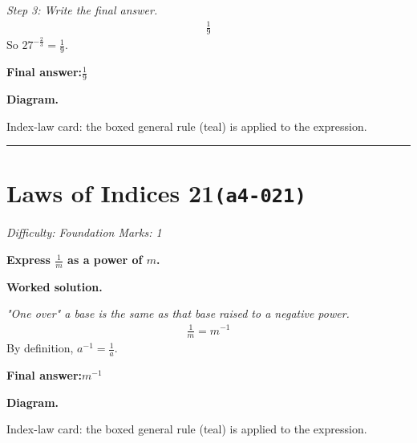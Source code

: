 \documentclass[11pt]{article}
\newcommand{\question}[1]{\par\medskip\noindent\textbf{#1}\par}
\begin{document}
\textit{Step 3: Write the final answer.}
\[\begin{gathered}
\frac{1}{9}
\end{gathered}\]
So \( 27^{-\frac{2}{3}} = \frac{1}{9} \).

\begin{answerbox}
\textbf{Final answer:}\quad \(\displaystyle \frac{1}{9}\)
\end{answerbox}
\textbf{Diagram.}

\begin{center}
\end{center}
\small Index-law card: the boxed general rule (teal) is applied to the expression.\normalsize

\medskip\hrule

\section*{Laws of Indices 21\quad\small\texttt{(a4-021)}}
\textit{Difficulty: Foundation \quad\textbar\quad Marks: 1}

\question{Express \( \frac{1}{m} \) as a power of \( m \).}

\textbf{Worked solution.}

\textit{"One over" a base is the same as that base raised to a negative power.}
\[\begin{gathered}
\frac{1}{m} = m^{-1}
\end{gathered}\]
By definition, \( a^{-1} = \frac{1}{a} \).

\begin{answerbox}
\textbf{Final answer:}\quad \(\displaystyle m^{-1}\)
\end{answerbox}
\textbf{Diagram.}

\begin{center}
\end{center}
\small Index-law card: the boxed general rule (teal) is applied to the expression.\normalsize
\end{document}
